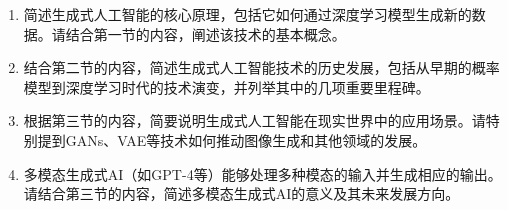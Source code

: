 \begin{enumerate}
    \item 简述生成式人工智能的核心原理，包括它如何通过深度学习模型生成新的数据。请结合第一节的内容，阐述该技术的基本概念。
    
    \item 结合第二节的内容，简述生成式人工智能技术的历史发展，包括从早期的概率模型到深度学习时代的技术演变，并列举其中的几项重要里程碑。
    
    \item 根据第三节的内容，简要说明生成式人工智能在现实世界中的应用场景。请特别提到GANs、VAE等技术如何推动图像生成和其他领域的发展。
    
    \item 多模态生成式AI（如GPT-4等）能够处理多种模态的输入并生成相应的输出。请结合第三节的内容，简述多模态生成式AI的意义及其未来发展方向。
\end{enumerate}


